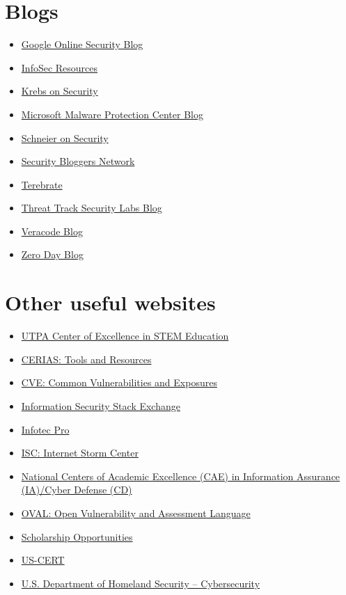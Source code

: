 \documentclass[a4paper, 12pt, titlepage]{report}
\begin{document}
\section{Blogs}
\begin{multicols}{2}
\begin{itemize}
\item \href{https://security.googleblog.com/}{Google Online Security Blog}
\item \href{https://resources.infosecinstitute.com/}{InfoSec Resources}
\item \href{https://krebsonsecurity.com/}{Krebs on Security}
\item \href{https://www.microsoft.com/security/blog/product/windows/}{Microsoft Malware Protection Center Blog}
\item \href{https://www.schneier.com/}{Schneier on Security}
\item \href{https://securityboulevard.com/feed/}{Security Bloggers Network}
\item \href{https://terebrate.blogspot.com/}{Terebrate}
\item \href{https://blog.threattrack.com/}{Threat Track Security Labs Blog}
\item \href{https://www.veracode.com/blog}{Veracode Blog}
\item \href{https://www.zdnet.com/blog/security/}{Zero Day Blog}
\end{itemize}
\end{multicols}
\section{Other useful websites}
\begin{multicols}{2}
\begin{itemize}
\item \href{https://www.utrgv.edu/utpa\_main/daa\_home/coecs\_home/cstem}{UTPA Center of Excellence in STEM Education}
\item \href{https://www.cerias.purdue.edu/site/tools\_and\_resources/}{CERIAS: Tools and Resources}
\item \href{https://cve.mitre.org/index.html}{CVE: Common Vulnerabilities and Exposures}
\item \href{https://security.stackexchange.com/}{Information Security Stack Exchange}
\item \href{http://www.infotectraining.com/}{Infotec Pro}
\item \href{https://isc.sans.edu/}{ISC: Internet Storm Center}
\item \href{https://www.nsa.gov/resources/students-educators/centers-academic-excellence/}{National Centers of Academic Excellence (CAE) in Information Assurance (IA)/Cyber Defense (CD)}
\item \href{https://oval.mitre.org/}{OVAL: Open Vulnerability and Assessment Language}
\item \href{https://niccs.us-cert.gov/}{Scholarship Opportunities}
\item \href{https://www.us-cert.gov/}{US-CERT}
\item \href{https://www.dhs.gov/topic/cybersecurity}{U.S. Department of Homeland Security – Cybersecurity}
\end{itemize}
\end{multicols}
\end{document}
